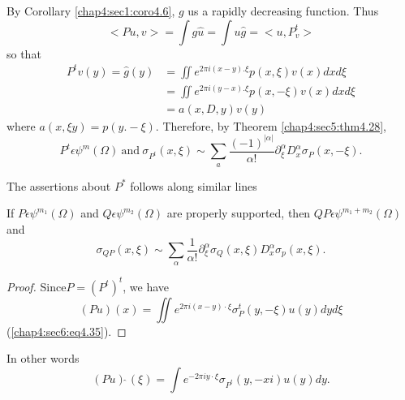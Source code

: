 By Corollary \ref{chap4:sec1:coro4.6}, $g$ us a rapidly decreasing
function. Thus 
$$
<Pu,v>= \int g \hat {u}= \int u \hat{g}=<u, P^t_v>
$$
so that
\begin{align*}
  P^tv (y)= \hat{g}(y) &= \iint e^{2 \pi i (x-y). \xi} p(x, \xi) v (x)dx
  d \xi \tag{4.35} \label{chap4:sec6:eq4.35}\\ 
  & = \iint e^{2 \pi i (y-x). \xi}p(x,- \xi) v (x)dx d \xi \\
  &=a(x,D,y)v (y)
\end{align*} 
where $a (x, \xi y)=p(y.-\xi)$. Therefore, by Theorem
\ref{chap4:sec5:thm4.28},    
  $$
  P^t \epsilon \psi ^m (\Omega) ~\text{and}~ \sigma _{P^t}(x,\xi)
  \sim \sum _a \frac{(-1)^{|\alpha|}}{\alpha !} \partial ^ \alpha _\xi
  D^\alpha _x \sigma _P (x, -\xi). 
  $$  
  
  The assertions about $P^*$ follows along similar lines
\setcounter{thm}{35}
\begin{thm}\label{chap4:sec6:thm4.36}%
  If $P \epsilon \psi^{m_1}(\Omega)$ and $Q \epsilon
  \psi^{m_2}(\Omega)$ are properly supported, then $QP \epsilon
  \psi^{m_1+m_2}(\Omega)$ and 
  $$
  \sigma_ {QP}(x,\xi)  \sim \sum_{\alpha} \frac{1}{ \alpha !}\partial
  ^\alpha _ \xi \sigma _{Q} (x, \xi) D^ \alpha _x \sigma_p (x,\xi). 
  $$
\end{thm}

\begin{proof}
  Since\pageoriginale $P = (P^t)^t$, we have
  $$
  (Pu) (x) = \iint e^{2 \pi i (x-y)\cdot \xi} \sigma_P^t (y, - \xi) u
  (y) dy d\xi 
  $$
   (\ref{chap4:sec6:eq4.35}).  
\end{proof}

In other words
$$
(Pu)\hat{~} (\xi) = \int e^{-2 \pi i y\cdot \xi} \sigma_{P^t} (y,  -xi) u (y) dy.
$$

